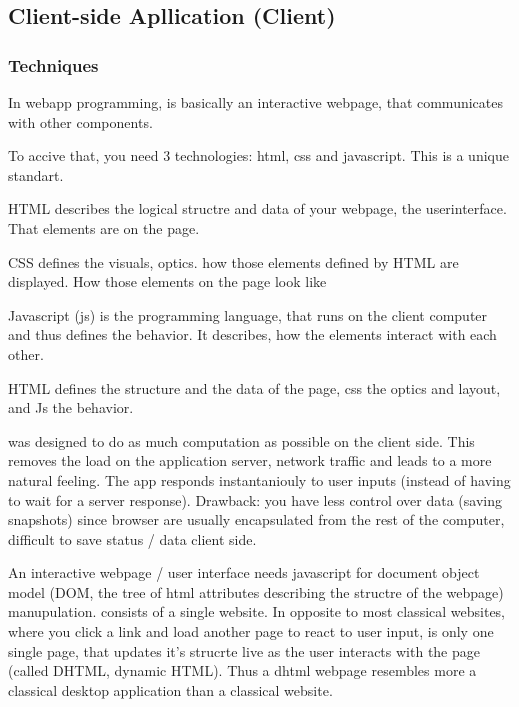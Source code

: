 \subsection{Client-side Apllication (Client)}
\label{sec:client}



\subsubsection{Techniques}
\label{sec:client_techniques}



In webapp programming, is basically an interactive webpage, that communicates with other components.

To accive that, you need 3 technologies: html, css and javascript. This is a unique standart.

HTML describes the logical structre and data of your webpage, the userinterface. That elements are on the page.

CSS defines the visuals, optics. how those elements defined by HTML are displayed. How those elements on the page look like

Javascript (js) is the programming language, that runs on the client computer and thus defines the behavior. It describes, how the elements interact with each other.

HTML defines the structure and the data of the page, css the optics and layout, and Js the behavior.


\spl was designed to do as much computation as possible on the client side.
This removes the load on the application server, network traffic and leads to a more natural feeling.
The app responds instantaniouly to user inputs (instead of having to wait for a server response).
Drawback: you have less control over data (saving snapshots) since browser are usually encapsulated from the rest of the computer, difficult to save status / data client side.


An interactive webpage / user interface needs javascript for document object model (DOM, the tree of html attributes describing the structre of the webpage) manupulation.
\spl consists of a single website.
In opposite to most classical websites, where you click a link and load another page to react to user input, \spl is only one single page, that updates it's strucrte live as the user interacts with the page (called DHTML, dynamic HTML).
Thus a dhtml webpage resembles more a classical desktop application than a classical website.

